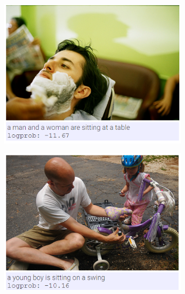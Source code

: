 \begin{figure}
\begin{subfigure}{.5\textwidth}
			\includegraphics[width=.8\linewidth]{Images/Results/Bad/shaving}
			\label{fig:badresults3}
		\end{subfigure}%
		\begin{subfigure}{.5\textwidth}
			\centering
			\includegraphics[width=.8\linewidth]{Images/Results/Bad/sitting_on_swing}
			\label{fig:badresults4}
		\end{subfigure}				\\
		\begin{subfigure}{.5\textwidth}
			\centering

\end{subfigure}
\end{figure}
